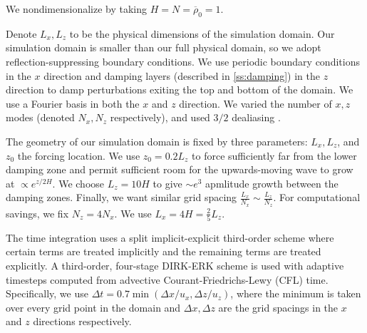 \documentclass[
        fleqn,
        usenatbib,
    ]{mnras}
\begin{document}
We nondimensionalize by taking $H = N = \overline{\rho}_0 = 1$.

Denote $L_x, L_z$ to be the physical dimensions of the simulation domain. Our
simulation domain is smaller than our full physical domain, so we adopt
reflection-suppressing boundary conditions. We use periodic boundary conditions
in the $x$ direction and damping layers (described in \autoref{ss:damping}) in
the $z$ direction to damp perturbations exiting the top and bottom of the
domain. We use a Fourier basis in both the $x$ and $z$ direction. We varied the
number of $x, z$ modes (denoted $N_x, N_z$ respectively), and used $3/2$
dealiasing \citep{boyd}.

The geometry of our simulation domain is fixed by three parameters: $L_x, L_z$,
and $z_0$ the forcing location. We use $z_0 = 0.2L_z$ to force sufficiently far
from the lower damping zone and permit sufficient room for the upwards-moving
wave to grow at $\propto e^{z/2H}$. We choose $L_z = 10H$ to give $\sim e^3$
apmlitude growth between the damping zones. Finally, we want similar grid
spacing $\frac{L_x}{N_x} \sim \frac{L_z}{N_z}$. For computational savings, we
fix $N_z = 4N_x$. We use $L_x = 4H = \frac{2}{5}L_z$.

The time integration uses a split implicit-explicit third-order scheme where
certain terms are treated implicitly and the remaining terms are treated
explicitly. A third-order, four-stage DIRK-ERK scheme \citep{ascher} is used
with adaptive timesteps computed from advective Courant-Friedrichs-Lewy (CFL)
time. Specifically, we use $\Delta t = 0.7 \min(\Delta x / u_x,\Delta z / u_{z})$,
where the minimum is taken over every grid point in the domain and $\Delta
x,\Delta z$ are the grid spacings in the $x$ and $z$ directions respectively.
\end{document}
